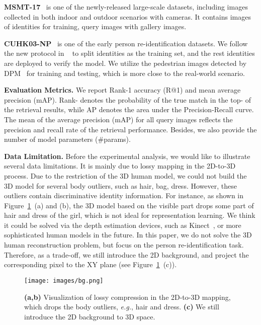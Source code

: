 \documentclass[journal]{IEEEtran}
\def\eg{\emph{e.g.}}
\begin{document}
\noindent\textbf{MSMT-17}~\cite{wei2018person} is one of the newly-released large-scale datasets, including  images collected in both indoor and outdoor scenarios with  cameras. It contains  images of  identities for training,  query images with  gallery images.

\noindent\textbf{CUHK03-NP}~\cite{li2014deepreid} is one of the early person re-identification datasets. We follow the new protocol in ~\cite{zhong2017re} to split  identities as the training set, and the rest  identities are deployed to verify the model. We utilize the pedestrian images detected by DPM~\cite{felzenszwalb2009object} for training and testing, which is more close to the real-world scenario.
 
\noindent\textbf{Evaluation Metrics.} We report Rank-1 accuracy (R@1) and mean average precision (mAP). Rank- denotes the probability of the true match in the  top- of the retrieval results, while AP denotes the
area under the Precision-Recall curve. The mean of the average precision (mAP) for all query images reflects the
precision and recall rate of the retrieval performance. Besides, we also provide the number of model parameters (\#params). 

\noindent\textbf{Data Limitation.} \label{sec:limitation}
Before the experimental analysis, we would like to illustrate several data limitations. It is mainly due to lossy mapping in the 2D-to-3D process.  Due to the restriction of the 3D human model, we could not build the 3D model for several body outliers, such as hair, bag, dress. However, these outliers contain discriminative identity information. For instance, as shown in Figure~\ref{fig:bg}~(a) and (b), the 3D model based on the visible part drops some part of hair and dress of the girl, which is not ideal for representation learning. We think it could be solved via the depth estimation devices, such as Kinect~\cite{han2013enhanced}, or more sophisticated human models in the future. In this paper, we do not solve the 3D human reconstruction problem, but focus on the person re-identification task. Therefore, as a trade-off, we still introduce the 2D background, and project the corresponding pixel to the XY plane (see Figure~\ref{fig:bg}~(c)).\begin{figure}{
\caption{\textbf{(a,b)} Visualization of lossy compression in the 2D-to-3D mapping, which drops the body outliers, \eg, hair and dress. \textbf{(c)} We still introduce the 2D background to 3D space. }\label{fig:bg}}{\texttt{[image: images/bg.png]}
}\end{figure} 
\end{document}
